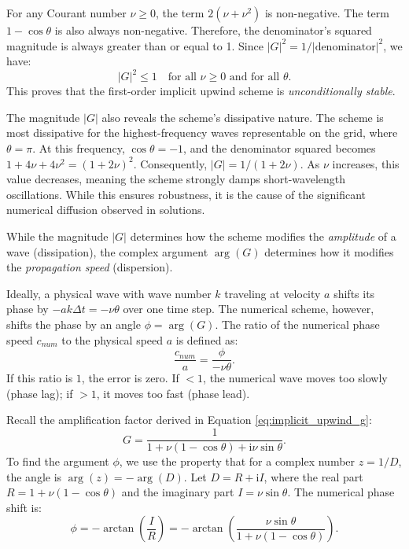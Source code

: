 For any Courant number \(\nu \geq 0\), the term \(2(\nu + \nu^2)\) is non-negative. 
The term \(1-\cos\theta\) is also always non-negative. 
Therefore, the denominator's squared magnitude is always greater than or equal to 1. 
Since \(|G|^2 = 1 / |\text{denominator}|^2\), we have:
\[
    |G|^2 \leq 1 \quad \text{for all } \nu \geq 0 \text{ and for all } \theta.
\]
This proves that the first-order implicit upwind scheme is \textit{unconditionally stable}.

The magnitude \(|G|\) also reveals the scheme's dissipative nature. 
The scheme is most dissipative for the highest-frequency waves representable on the grid, where \(\theta = \pi\). 
At this frequency, \( \cos \theta = -1 \), and the denominator squared becomes \( 1 + 4\nu + 4\nu^2 = (1+2\nu)^2 \). 
Consequently, \(|G| = 1/(1+2\nu)\). 
As \(\nu\) increases, this value decreases, meaning the scheme strongly damps short-wavelength oscillations. 
While this ensures robustness, it is the cause of the significant numerical diffusion observed in solutions.

While the magnitude \(|G|\) determines how the scheme modifies the \emph{amplitude} of a wave (dissipation), the complex argument \(\arg(G)\) determines how it modifies the \emph{propagation speed} (dispersion).

Ideally, a physical wave with wave number \(k\) traveling at velocity \(a\) shifts its phase by \(-ak\Delta t = -\nu\theta\) over one time step.
The numerical scheme, however, shifts the phase by an angle \(\phi = \arg(G)\).
The ratio of the numerical phase speed \(c_{num}\) to the physical speed \(a\) is defined as:
\begin{equation}
    \frac{c_{num}}{a} = \frac{\phi}{-\nu\theta}.
\end{equation}
If this ratio is \(1\), the error is zero. If \(<1\), the numerical wave moves too slowly (phase lag); if \(>1\), it moves too fast (phase lead).

Recall the amplification factor derived in Equation \eqref{eq:implicit_upwind_g}:
\[
    G = \frac{1}{1 + \nu(1 - \cos\theta) + \mathrm{i}\nu\sin\theta}.
\]
To find the argument \(\phi\), we use the property that for a complex number \(z = 1/D\), the angle is \(\arg(z) = -\arg(D)\).
Let \(D = R + \mathrm{i}I\), where the real part \(R = 1 + \nu(1-\cos\theta)\) and the imaginary part \(I = \nu\sin\theta\).
The numerical phase shift is:
\begin{equation}
    \phi = -\arctan\left( \frac{I}{R} \right) = -\arctan\left( \frac{\nu\sin\theta}{1 + \nu(1 - \cos\theta)} \right).
\end{equation}

